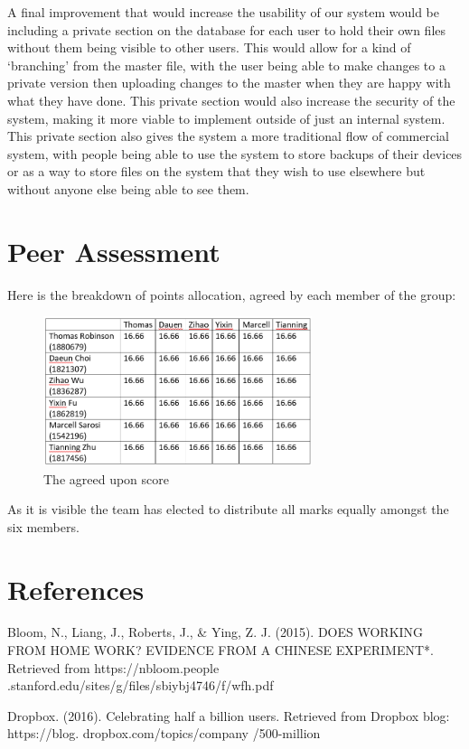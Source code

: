 \documentclass[11pt]{article}
\begin{document}
A final improvement that would increase the usability of our system would be including a private section on the database for each user to hold their own files without them being visible to other users. This would allow for a kind of ‘branching’ from the master file, with the user being able to make changes to a private version then uploading changes to the master when they are happy with what they have done. This private section would also increase the security of the system, making it more viable to implement outside of just an internal system. This private section also gives the system a more traditional flow of commercial system, with people being able to use the system to store backups of their devices or as a way to store files on the system that they wish to use elsewhere but without anyone else being able to see them.

\section{Peer Assessment}
Here is the breakdown of points allocation, agreed by each member of the group:

\begin{figure} [h!]
\caption{The agreed upon score}
\centering
\includegraphics[width=0.7\textwidth]{peer.PNG}
\end{figure}

As it is visible the team has elected to distribute all marks equally amongst the six members.


\section{References}

Bloom, N., Liang, J., Roberts, J., \& Ying, Z. J. 
(2015).
DOES WORKING FROM HOME WORK? EVIDENCE 
FROM A CHINESE EXPERIMENT*.
Retrieved from https://nbloom.people
.stanford.edu/sites/g/files/sbiybj4746/f/wfh.pdf


Dropbox. (2016). Celebrating half a
billion users. Retrieved
from Dropbox blog: https://blog.
dropbox.com/topics/company
/500-million
\end{document}

